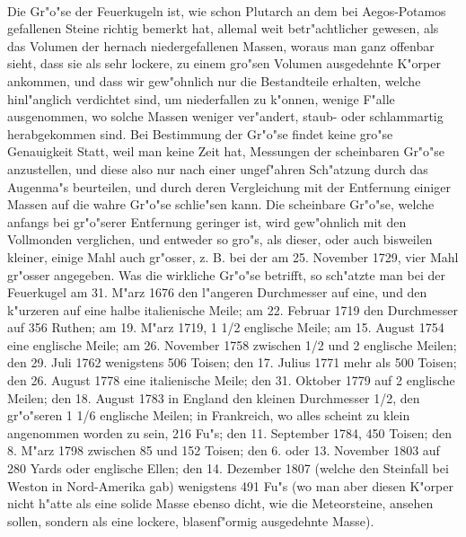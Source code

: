 \documentclass[a4paper, 11pt, oneside, polutonikogreek, german]{article}
\begin{document}
\paragraph{}
Die Gr"o"se der Feuerkugeln ist, wie schon Plutarch an dem bei Aegos-Potamos gefallenen Steine richtig bemerkt hat, allemal weit betr"achtlicher gewesen, als das Volumen der hernach niedergefallenen Massen, woraus man ganz offenbar sieht, dass sie als sehr lockere, zu einem gro"sen Volumen ausgedehnte K"orper ankommen, und dass wir gew"ohnlich nur die Bestandteile erhalten, welche hinl"anglich verdichtet sind, um niederfallen zu k"onnen, wenige F"alle ausgenommen, wo solche Massen weniger ver"andert, staub- oder schlammartig herabgekommen sind. Bei Bestimmung der Gr"o"se findet keine gro"se Genauigkeit Statt, weil man keine Zeit hat, Messungen der scheinbaren Gr"o"se anzustellen, und diese also nur nach einer ungef"ahren Sch"atzung durch das Augenma"s beurteilen, und durch deren Vergleichung mit der Entfernung einiger Massen auf die wahre Gr"o"se schlie"sen kann. Die scheinbare Gr"o"se, welche anfangs bei gr"o"serer Entfernung geringer ist, wird gew"ohnlich mit den Vollmonden verglichen, und entweder so gro"s, als dieser, oder auch bisweilen kleiner, einige Mahl auch gr"osser, z. B. bei der am 25. November 1729, vier Mahl gr"osser angegeben. Was die wirkliche Gr"o"se betrifft, so sch"atzte man bei der Feuerkugel am 31. M"arz 1676 den l"angeren Durchmesser auf eine, und den k"urzeren auf eine halbe italienische Meile; am 22. Februar 1719 den Durchmesser auf 356 Ruthen; am 19. M"arz 1719, 1 1/2 englische Meile; am 15. August 1754 eine englische Meile; am 26. November 1758 zwischen 1/2 und 2 englische Meilen; den 29. Juli 1762 wenigstens 506 Toisen; den 17. Julius 1771 mehr als 500 Toisen; den 26. August 1778 eine italienische Meile; den 31. Oktober 1779 auf 2 englische Meilen; den 18. August 1783 in England den kleinen Durchmesser 1/2, den gr"o"seren 1 1/6 englische Meilen; in Frankreich, wo alles scheint zu klein angenommen worden zu sein, 216 Fu"s; den 11. September 1784, 450 Toisen; den 8. M"arz 1798 zwischen 85 und 152 Toisen; den 6. oder 13. November 1803 auf 280 Yards oder englische Ellen; den 14. Dezember 1807 (welche den Steinfall bei Weston in Nord-Amerika gab) wenigstens 491 Fu"s (wo man aber diesen K"orper nicht h"atte als eine solide Masse ebenso dicht, wie die Meteorsteine, ansehen sollen, sondern als eine lockere, blasenf"ormig ausgedehnte Masse).
\subsection{}
\end{document}
